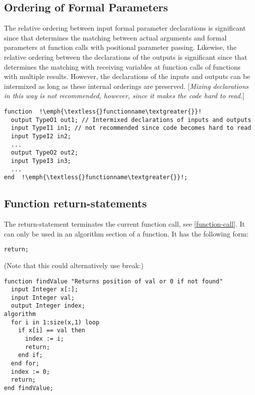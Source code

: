 \subsection{Ordering of Formal Parameters}

The relative ordering between input formal parameter declarations is
significant since that determines the matching between actual arguments
and formal parameters at function calls with positional parameter
passing. Likewise, the relative ordering between the declarations of the
outputs is significant since that determines the matching with receiving
variables at function calls of functions with multiple results. However,
the declarations of the inputs and outputs can be intermixed as long as
these internal orderings are preserved. {[}\emph{Mixing declarations in
this way is not recommended, however, since it makes the code hard to
read.}{]}

\begin{example}
\begin{lstlisting}[language=modelica,escapechar=!]
function  !\emph{\textless{}functionname\textgreater{}}!
  output TypeO1 out1; // Intermixed declarations of inputs and outputs
  input TypeI1 in1; // not recommended since code becomes hard to read
  input TypeI2 in2;
  ...
  output TypeO2 out2;
  input TypeI3 in3;
  ...
end  !\emph{\textless{}functionname\textgreater{}}!;
\end{lstlisting}
\end{example}

\subsection{Function return-statements}

The return-statement terminates the current function call, see \autoref{function-call}.
It can only be used in an algorithm section of a function. It has
the following form:
\begin{lstlisting}[language=modelica]
return;
\end{lstlisting}

\begin{example}
(Note that this could alternatively use break:)
\begin{lstlisting}[language=modelica]
function findValue "Returns position of val or 0 if not found"
  input Integer x[:];
  input Integer val;
  output Integer index;
algorithm
  for i in 1:size(x,1) loop
    if x[i] == val then
      index := i;
      return;
    end if;
  end for;
  index := 0;
  return;
end findValue;
\end{lstlisting}
\end{example}

